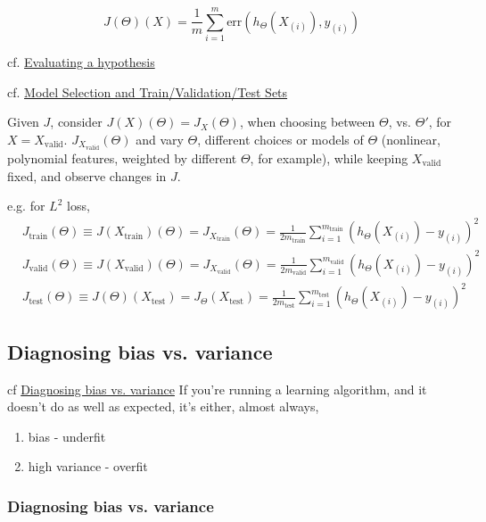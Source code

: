 \documentclass[10pt]{amsart}
\begin{document}
\begin{multicols*}{2}
\[
J(\Theta)(X) = \frac{1}{m} \sum_{i=1}^m \text{err}(h_{\Theta}(X_{(i)}), y_{(i)} )
\]


cf. \href{https://www.coursera.org/learn/machine-learning/supplement/aFpD3/evaluating-a-hypothesis}{Evaluating a hypothesis}

cf. \href{https://www.coursera.org/learn/machine-learning/lecture/QGKbr/model-selection-and-train-validation-test-sets}{Model Selection and Train/Validation/Test Sets}

Given $J$, consider $J(X)(\Theta) = J_X(\Theta)$, when choosing between $\Theta$, vs. $\Theta'$, for $X=X_{\text{valid}}$.  $J_{X_{\text{valid}}}(\Theta)$ and vary $\Theta$, different choices or models of $\Theta$ (nonlinear, polynomial features, weighted by different $\Theta$, for example), while keeping $X_{\text{valid}}$ fixed, and observe changes in $J$.  

e.g. for $L^2$ loss, 
\[
\begin{aligned}
	& J_{\text{train}}(\Theta) \equiv  J(X_{\text{train}})(\Theta) = J_{X_{\text{train}}}(\Theta) = \frac{1}{2m_{\text{train}}} \sum_{i=1}^{m_{\text{train}} } (h_{\Theta}(X_{(i)}) -y_{(i)} )^2 \\ 
	& J_{\text{valid}}(\Theta) \equiv  J(X_{\text{valid}})(\Theta) = J_{X_{\text{valid}}}(\Theta) = \frac{1}{2m_{\text{valid}}} \sum_{i=1}^{m_{\text{valid}} } (h_{\Theta}(X_{(i)}) -y_{(i)} )^2 \\
	& J_{\text{test}}(\Theta) \equiv  J(\Theta)(X_{\text{test}}) = J_{\Theta}(X_{\text{test}}) = \frac{1}{2m_{\text{test}}} \sum_{i=1}^{m_{\text{test}} } (h_{\Theta}(X_{(i)}) -y_{(i)} )^2 
\end{aligned}
\]

\subsection{Diagnosing bias vs. variance}

cf \href{https://www.coursera.org/learn/machine-learning/lecture/yCAup/diagnosing-bias-vs-variance}{Diagnosing bias vs. variance}  If you're running a learning algorithm, and it doesn't do as well as expected, it's either, almost always,
\begin{enumerate}
\item bias - underfit
\item high variance - overfit
\end{enumerate}

\subsubsection{Diagnosing bias vs. variance}


\end{multicols*}
\end{document}

